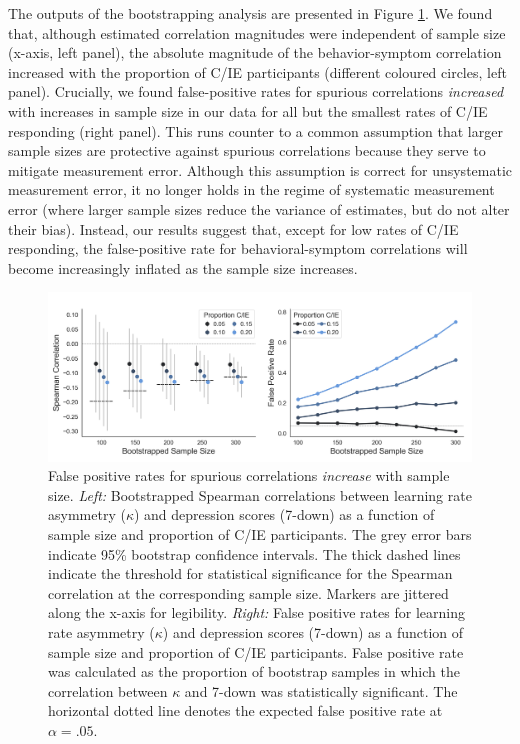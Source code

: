 \documentclass[a4paper,notitlepage,12pt]{article}
\begin{document}
\begin{refsection}[main]
The outputs of the bootstrapping analysis are presented in Figure \ref{fig:bootstrap}. We found that, although estimated correlation magnitudes were independent of sample size (x-axis, left panel), the absolute magnitude of the behavior-symptom correlation increased with the proportion of C/IE participants (different coloured circles, left panel). Crucially, we found false-positive rates for spurious correlations \emph{increased} with increases in sample size in our data for all but the smallest rates of C/IE responding (right panel). This runs counter to a common assumption that larger sample sizes are protective against spurious correlations because they serve to mitigate measurement error. Although this assumption is correct for unsystematic measurement error, it no longer holds in the regime of systematic measurement error (where larger sample sizes reduce the variance of estimates, but do not alter their bias). Instead, our results suggest that, except for low rates of C/IE responding, the false-positive rate for behavioral-symptom correlations will become increasingly inflated as the sample size increases.

\begin{figure}[!t]
\includegraphics[width=16cm]{../figures/main_03b.png}
\centering
\captionsetup{width=0.88\textwidth}
\caption{False positive rates for spurious correlations \emph{increase} with sample size. \textit{Left:} Bootstrapped Spearman correlations between learning rate asymmetry ($\kappa$) and depression scores (7-down) as a function of sample size and proportion of C/IE participants. The grey error bars indicate 95\% bootstrap confidence intervals. The thick dashed lines indicate the threshold for statistical significance for the Spearman correlation at the corresponding sample size. Markers are jittered along the x-axis for legibility. \textit{Right:} False positive rates for learning rate asymmetry ($\kappa$) and depression scores (7-down) as a function of sample size and proportion of C/IE participants. False positive rate was calculated as the proportion of bootstrap samples in which the correlation between $\kappa$ and 7-down was statistically significant. The horizontal dotted line denotes the expected false positive rate at $\alpha = .05$.}
\label{fig:bootstrap}
\end{figure}


\end{refsection}
\end{document}
